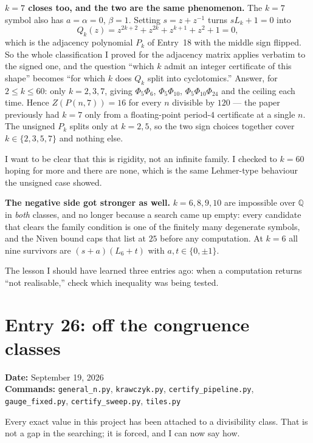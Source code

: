 \documentclass[12pt]{article}
\begin{document}
\textbf{$k=7$ closes too, and the two are the same phenomenon.} The $k=7$
symbol also has $a=\alpha=0$, $\beta=1$. Setting $s=z+z^{-1}$ turns
$sL_k+1=0$ into
\[
  Q_k(z)=z^{2k+2}+z^{2k}+z^{k+1}+z^{2}+1=0,
\]
which is the adjacency polynomial $P_k$ of Entry~18 with the middle sign
flipped. So the whole classification I proved for the adjacency matrix applies
verbatim to the signed one, and the question ``which $k$ admit an integer
certificate of this shape'' becomes ``for which $k$ does $Q_k$ split into
cyclotomics.'' Answer, for $2\le k\le60$: only $k=2,3,7$, giving
$\Phi_5\Phi_6$, $\Phi_5\Phi_{10}$, $\Phi_5\Phi_{10}\Phi_{24}$ and the ceiling
each time. Hence $Z(P(n,7))=16$ for every $n$ divisible by $120$ --- the paper
previously had $k=7$ only from a floating-point period-$4$ certificate at a
single $n$. The unsigned $P_k$ splits only at $k=2,5$, so the two sign choices
together cover $k\in\{2,3,5,7\}$ and nothing else.

I want to be clear that this is rigidity, not an infinite family. I checked to
$k=60$ hoping for more and there are none, which is the same Lehmer-type
behaviour the unsigned case showed.

\textbf{The negative side got stronger as well.} $k=6,8,9,10$ are impossible
over $\mathbb Q$ in \emph{both} classes, and no longer because a search came up
empty: every candidate that clears the family condition is one of the finitely
many degenerate symbols, and the Niven bound caps that list at $25$
before any computation. At $k=6$ all nine survivors are $(s+a)(L_6+t)$ with
$a,t\in\{0,\pm1\}$.

The lesson I should have learned three entries ago: when a computation returns
``not realisable,'' check which inequality was being tested.


\clearpage
\section*{Entry 26: off the congruence classes}
\textbf{Date:} September 19, 2026\\
\textbf{Commands:} {\small\texttt{general\_n.py}, \texttt{krawczyk.py},
\texttt{certify\_pipeline.py},}\\
{\small\texttt{gauge\_fixed.py}, \texttt{certify\_sweep.py}, \texttt{tiles.py}}

Every exact value in this project has been attached to a divisibility class.
That is not a gap in the searching; it is forced, and I can now say how.
\end{document}

